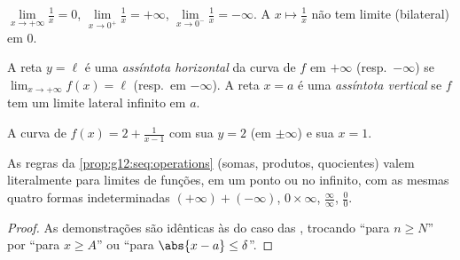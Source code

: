 \begin{example}
$\lim\limits_{x\to+\infty} \frac{1}{x} = 0$,
$\lim\limits_{x\to 0^+} \frac{1}{x} = +\infty$,
$\lim\limits_{x\to 0^-} \frac{1}{x} = -\infty$. A 
$x \mapsto \frac1x$ não tem limite (bilateral) em $0$.
\end{example}

\begin{definition}[Assíntotas]\label{def:g12:limcont:asymptote}
A reta $y = \ell$ é uma \emph{assíntota horizontal} da
curva de $f$ em $+\infty$ (resp.\ $-\infty$) se
$\lim_{x\to+\infty} f(x) = \ell$ (resp.\ em $-\infty$). A reta $x = a$ é
uma \emph{assíntota vertical} se $f$ tem um limite
lateral infinito em $a$.
\end{definition}

\begin{omfigure}

{\small A curva de $f(x) = 2 + \frac{1}{x-1}$ com sua  $y = 2$ (em $\pm\infty$) e sua  $x = 1$.}
\end{omfigure}

\begin{proposition}\label{prop:g12:limcont:operations}
As regras da \cref{prop:g12:seq:operations} (somas, produtos, quocientes)
valem literalmente para limites de funções, em um ponto ou no infinito,
com as mesmas quatro formas indeterminadas $(+\infty)+(-\infty)$,
$0\times\infty$, $\frac{\infty}{\infty}$, $\frac{0}{0}$.
\end{proposition}

\begin{proof}
As demonstrações são idênticas às do caso das , trocando ``para
$n \geq N$'' por ``para $x \geq A$'' ou ``para
$\abs{x-a} \leq \delta$''.
\end{proof}

